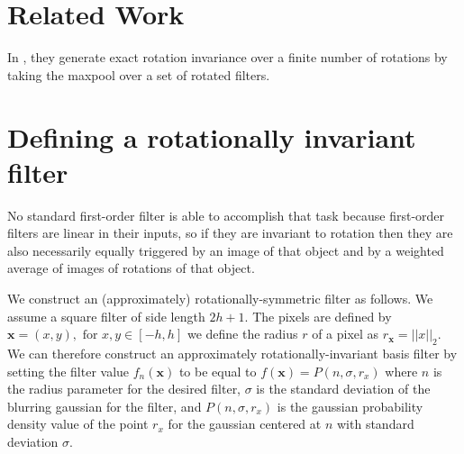 \documentclass{article}
\begin{document}
\section{Related Work}
In \cite{marcos}, they generate exact rotation invariance over a finite number of rotations by taking the maxpool over a set of rotated filters.

\section{Defining a rotationally invariant filter}
No standard first-order filter is able to accomplish that task because first-order filters are linear in their inputs, so if they are invariant to rotation then they are also necessarily equally triggered by an image of that object and by a weighted average of images of rotations of that object.

We construct an (approximately) rotationally-symmetric filter as follows. 
We assume a square filter of side length $2h + 1$. 
The pixels are defined by $\mathbf x = (x,y),\text{ for } x,y\in [-h,h]$ we define the radius $r$ of a pixel as $r_{\mathbf{x}} = ||x||_2$. 
We can therefore construct an approximately rotationally-invariant basis filter by setting the filter value $f_n(\mathbf{x})$ to be equal to
$f(\mathbf{x}) = P(n,\sigma,r_x)$ 
where $n$ is the radius parameter for the desired filter, $\sigma$ is the standard deviation of the blurring gaussian for the filter, and $P(n, \sigma, r_x)$ is the gaussian probability density value of the point $r_x$ for the gaussian centered at $n$ with standard deviation $\sigma$.
\end{document}
